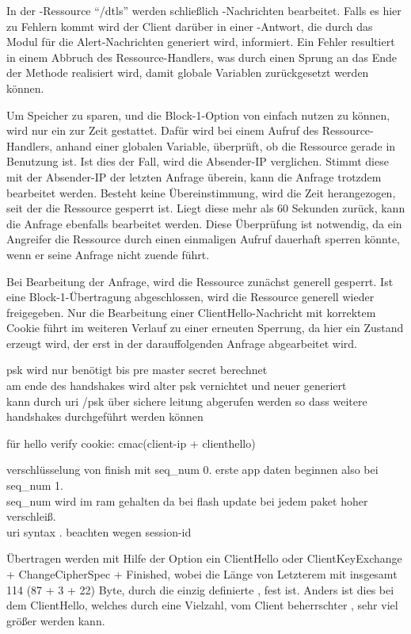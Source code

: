 In der -Ressource "`/dtls"' werden schließlich -Nachrichten bearbeitet. Falls es hier zu Fehlern kommt wird der Client darüber in einer
-Antwort, die durch das Modul für die Alert-Nachrichten generiert wird, informiert. Ein Fehler resultiert in einem Abbruch des Ressource-Handlers,
was durch einen Sprung an das Ende der Methode realisiert wird, damit globale Variablen zurückgesetzt werden können.

Um Speicher zu sparen, und die Block-1-Option von  einfach nutzen zu können, wird nur ein  zur Zeit gestattet. Dafür wird bei einem Aufruf des
Ressource-Handlers, anhand einer globalen Variable, überprüft, ob die Ressource gerade in Benutzung ist. Ist dies der Fall, wird die Absender-IP verglichen.
Stimmt diese mit der Absender-IP der letzten Anfrage überein, kann die Anfrage trotzdem bearbeitet werden. Besteht keine Übereinstimmung, wird die Zeit herangezogen,
seit der die Ressource gesperrt ist. Liegt diese mehr als 60 Sekunden zurück, kann die Anfrage ebenfalls bearbeitet werden. Diese Überprüfung ist notwendig, da
ein Angreifer die Ressource durch einen einmaligen Aufruf dauerhaft sperren könnte, wenn er seine Anfrage nicht zuende führt.

Bei Bearbeitung der Anfrage, wird die Ressource zunächst generell gesperrt. Ist eine Block-1-Übertragung abgeschlossen, wird die Ressource generell wieder freigegeben.
Nur die Bearbeitung einer ClientHello-Nachricht mit korrektem Cookie führt im weiteren Verlauf zu einer erneuten Sperrung, da hier ein Zustand erzeugt wird, der erst
in der darauffolgenden Anfrage abgearbeitet wird.

psk wird nur benötigt bis pre master secret berechnet\\
am ende des handshakes wird alter psk vernichtet und neuer generiert\\
kann durch uri /psk über sichere leitung abgerufen werden so dass weitere handshakes durchgeführt werden können

für hello verify cookie: cmac(client-ip + clienthello)

verschlüsselung von finish mit seq\_num 0. erste app daten beginnen also bei seq\_num 1.\\
seq\_num wird im ram gehalten da bei flash update bei jedem paket hoher verschleiß.\\

uri syntax \cite{rfc3986}. beachten wegen session-id

Übertragen werden mit Hilfe der Option ein ClientHello oder ClientKeyExchange + ChangeCipherSpec + Finished, wobei die Länge von Letzterem mit
insgesamt 114 (87 + 3 + 22) Byte, durch die einzig definierte , fest ist. Anders ist dies bei dem ClientHello, welches durch
eine Vielzahl, vom Client beherrschter , sehr viel größer werden kann.

